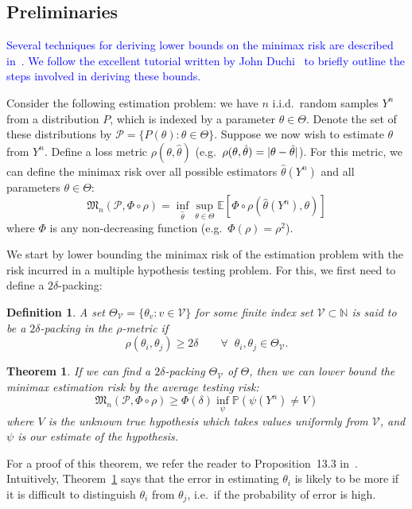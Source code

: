 \documentclass[conference]{IEEEtran}
\DeclarePairedDelimiter\abs{\lvert}{\rvert}
\newcommand{\Phiorho}{\Phi\!\circ\!\rho}
\newtheorem{theorem}{Theorem}
\newtheorem{definition}{Definition}
\begin{document}
\subsection{Preliminaries}

\textcolor{blue}{
Several techniques for deriving lower bounds on the minimax risk are described
in~\cite{Tsybakov2009Introduction}. We follow the excellent tutorial written by
John Duchi~\cite{Duchi2015Information} to briefly outline the steps involved in
deriving these bounds.
}

Consider the following estimation problem: we have $n$ i.i.d.\ random samples
$Y^n$ from a distribution $P$, which is indexed by a parameter $\theta \in
\Theta$.  Denote the set of these distributions by $\mathcal{P} = \{P(\theta) :
\theta \in \Theta\}$. Suppose we now wish to estimate $\theta$ from $Y^n$.
Define a loss metric $\rho(\theta, \hat\theta)$ (e.g.\ $\rho(\theta,
\hat\theta) = \abs{\theta - \hat\theta}$). For this metric, we can define the
minimax risk over all possible estimators $\hat\theta(Y^n)$ and all parameters
$\theta \in \Theta$:
\begin{equation} \label{eq:minimax-expr}
	\mathfrak{M}_n(\mathcal{P}, \Phiorho) = \inf_{\hat\theta} \sup_{\theta \in \Theta} \mathbb E[\Phiorho (\hat\theta(Y^n), \theta)]
\end{equation}
where $\Phi$ is any non-decreasing function (e.g.\ $\Phi(\rho) = \rho^2$).

We start by lower bounding the minimax risk of the estimation problem with the
risk incurred in a multiple hypothesis testing problem. For this, we first need
to define a $2\delta$-packing:%
\begin{definition}
	A set $\Theta_{\mathcal{V}} = \{ \theta_v : v \in \mathcal{V} \}$ for some
	finite index set $\mathcal{V} \subset \mathbb N$ is said to be a
	$2\delta$-packing in the $\rho$-metric if
	\begin{equation}
		\rho(\theta_i, \theta_j) \geq 2\delta \qquad \forall \;\; \theta_i, \theta_j \in \Theta_{\mathcal{V}}.
	\end{equation}
\end{definition}
\begin{theorem} \label{thm:est-to-testing}%
	If we can find a $2\delta$-packing $\Theta_{\mathcal{V}}$ of $\Theta$, then
	we can lower bound the minimax estimation risk by the average testing risk:
	\begin{equation}
		\mathfrak{M}_n(\mathcal{P}, \Phiorho) \geq \Phi(\delta) \inf_\psi \mathbb P (\psi(Y^n) \neq V)
	\end{equation}
	where $V$ is the unknown true hypothesis which takes values uniformly from
	$\mathcal{V}$, and $\psi$ is our estimate of the hypothesis.
\end{theorem}
For a proof of this theorem, we refer the reader to Proposition~13.3
in~\cite{Duchi2015Information}.  Intuitively, Theorem~\ref{thm:est-to-testing}
says that the error in estimating $\theta_i$ is likely to be more if it is
difficult to distinguish $\theta_i$ from $\theta_j$, i.e.\ if the probability
of error is high.
\end{document}
